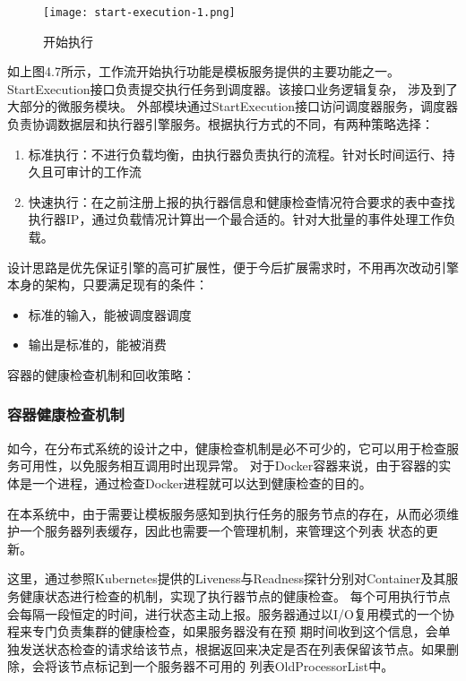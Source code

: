 \begin{figure}[H]
\centering
\texttt{[image: start-execution-1.png]}
\caption{开始执行}
\label{fig:kszx}
\end{figure}

如上图4.7所示，工作流开始执行功能是模板服务提供的主要功能之一。StartExecution接口负责提交执行任务到调度器。该接口业务逻辑复杂，
涉及到了大部分的微服务模块。 外部模块通过StartExecution接口访问调度器服务，调度器负责协调数据层和执行器引擎服务。根据执行方式的不同，有两种策略选择：

\begin{enumerate}
    \item 标准执行：不进行负载均衡，由执行器负责执行的流程。针对长时间运行、持久且可审计的工作流
    \item 快速执行：在之前注册上报的执行器信息和健康检查情况符合要求的表中查找执行器IP，通过负载情况计算出一个最合适的。针对大批量的事件处理工作负载。
\end{enumerate}


设计思路是优先保证引擎的高可扩展性，便于今后扩展需求时，不用再次改动引擎本身的架构，只要满足现有的条件：
\begin{itemize}
    \item 标准的输入，能被调度器调度
    \item 输出是标准的，能被消费
\end{itemize}

容器的健康检查机制和回收策略：
\subsubsection{容器健康检查机制}

如今，在分布式系统的设计之中，健康检查机制是必不可少的，它可以用于检查服务可用性，以免服务相互调用时出现异常。
对于Docker容器来说，由于容器的实体是一个进程，通过检查Docker进程就可以达到健康检查的目的\cite{zw1}。

在本系统中，由于需要让模板服务感知到执行任务的服务节点的存在，从而必须维护一个服务器列表缓存，因此也需要一个管理机制，来管理这个列表
状态的更新。

这里，通过参照Kubernetes提供的Liveness与Readness探针分别对Container及其服务健康状态进行检查的机制\cite{wfwr442}，实现了执行器节点的健康检查。
每个可用执行节点会每隔一段恒定的时间，进行状态主动上报。服务器通过以I/O复用模式的一个协程来专门负责集群的健康检查，如果服务器没有在预
期时间收到这个信息，会单独发送状态检查的请求给该节点，根据返回来决定是否在列表保留该节点。如果删除，会将该节点标记到一个服务器不可用的
列表OldProcessorList中\cite{zw2}。

